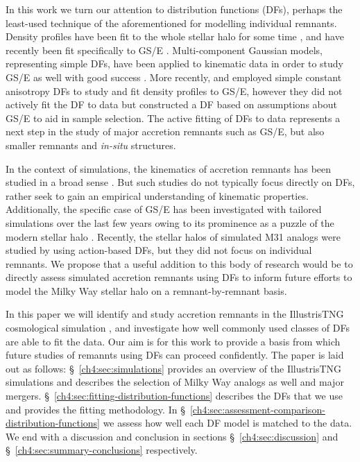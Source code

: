 In this work we turn our attention to distribution functions (DFs), perhaps the least-used technique of the aforementioned for modelling individual remnants. Density profiles have been fit to the whole stellar halo for some time \parencite[for contemporary examples see][]{deason19,mackereth20}, and have recently been fit specifically to GS/E \parencite{han22,lane23}. Multi-component Gaussian models, representing simple DFs, have been applied to kinematic data in order to study GS/E as well with good success \parencite[e.g.][]{lancaster19,fattahi19,iorio21}. More recently, \textcite{lane22} and \textcite{lane23} employed simple constant anisotropy DFs to study and fit density profiles to GS/E, however they did not actively fit the DF to data but constructed a DF based on assumptions about GS/E to aid in sample selection. The active fitting of DFs to data represents a next step in the study of major accretion remnants such as GS/E, but also smaller remnants and \textit{in-situ} structures.

In the context of simulations, the kinematics of accretion remnants has been studied in a broad sense \parencite[e.g.][]{johnston08,deason13,amorisco17,jean-baptiste17}. But such studies do not typically focus directly on DFs, rather seek to gain an empirical understanding of kinematic properties. Additionally, the specific case of GS/E has been investigated with tailored simulations over the last few years owing to its prominence as a puzzle of the modern stellar halo \parencite{naidu21,amarante22}. Recently, the stellar halos of simulated M31 analogs were studied by \textcite{gherghinescu23} using action-based DFs, but they did not focus on individual remnants. We propose that a useful addition to this body of research would be to directly assess simulated accretion remnants using DFs to inform future efforts to model the Milky Way stellar halo on a remnant-by-remnant basis.

In this paper we will identify and study accretion remnants in the IllustrisTNG cosmological simulation \parencite{tng_public_release_nelson19}, and investigate how well commonly used classes of DFs are able to fit the data. Our aim is for this work to provide a basis from which future studies of remannts using DFs can proceed confidently. The paper is laid out as follows: \S~\ref{ch4:sec:simulations} provides an overview of the IllustrisTNG simulations and describes the selection of Milky Way analogs as well and major mergers. \S~\ref{ch4:sec:fitting-distribution-functions} describes the DFs that we use and provides the fitting methodology. In \S~\ref{ch4:sec:assessment-comparison-distribution-functions} we assess how well each DF model is matched to the data. We end with a discussion and conclusion in sections \S~\ref{ch4:sec:discussion} and \S~\ref{ch4:sec:summary-conclusions} respectively.


